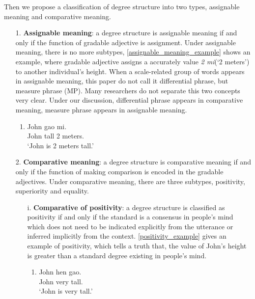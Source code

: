 \documentclass{ctexart}
\begin{document}
Then we propose a classification of degree structure into two types, assignable meaning and comparative meaning.

\begin{itemize}

    \item[1.] \textbf{Assignable meaning}: a degree structure is assignable meaning if and only if the function of gradable adjective is assignment. Under assignable meaning, there is no more subtypes, \ref{assignable_meaning_example} shows an example, where gradable adjective assigns a accurately value \textit{2 mi}(`2 meters') to another individual's height. When a scale-related group of words appears in assignable meaning, this paper do not call it differential phrase, but measure phrase (MP). Many researchers do not separate this two concepts very clear. Under our discussion, differential phrase appears in comparative meaning, measure phrase appears in assignable meaning. 
    
    \begin{enumerate}
        \item \label{assignable_meaning_example}
        John gao  mi.\\
        John tall 2 meters. \\
        `John is 2 meters tall.'
    \end{enumerate}
    
    \item[2.] \textbf{Comparative meaning}: a degree structure is comparative meaning if and only if the function of making comparison is encoded in the gradable adjectives. Under comparative meaning, there are three subtypes, positivity, superiority and equality. 
    
    \begin{itemize}

        \item[i.] \textbf{Comparative of positivity}: a degree structure is classified as positivity if and only if the standard is a consensus in people's mind which does not need to be indicated explicitly from the utterance or inferred implicitly from the context. \ref{positivity_example} gives an example of positivity, which tells a truth that, the value of John's height is greater than a standard degree existing in people's mind. 
        
        \begin{enumerate}
            \item \label{positivity_example}
            John hen gao. \\
            John very tall. \\
            `John is very tall.'
        \end{enumerate}
        

\end{itemize}
\end{itemize}
\end{document}
